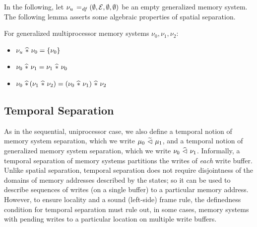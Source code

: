 \documentclass[11pt]{report}         %
\begin{document}
In the following, let $\nu_u \operatorname{\;=_{\mathit{df}}\;} (\operatorname{\emptyset}, \mathcal{E}, \operatorname{\emptyset}, \operatorname{\emptyset})$ be an empty generalized memory system. The following lemma asserts some algebraic properties of spatial separation. \begin{proposition}
  \label{lem:spatial-separation-algebra}
  For generalized multiprocessor memory systems $\nu_0, \nu_1, \nu_2$: 
  \begin{itemize}
    \item $\nu_u \operatorname{\,\widehat{\ast}\,} \nu_0 = \left\lbrace \nu_0 \right\rbrace$
    \item $\nu_0 \operatorname{\,\widehat{\ast}\,} \nu_1 = \nu_1 \operatorname{\,\widehat{\ast}\,} \nu_0$
    \item $\nu_0 \operatorname{\,\widehat{\ast}\,} (\nu_1 \operatorname{\,\widehat{\ast}\,} \nu_2) = (\nu_0 \operatorname{\,\widehat{\ast}\,} \nu_1) \operatorname{\,\widehat{\ast}\,} \nu_2$
  \end{itemize}
\end{proposition}

\subsection{Temporal Separation}
\label{sec:temporal-separation}

As in the sequential, uniprocessor case, we also define a temporal notion of memory system separation, which we write $\mu_0 \operatorname{\,\widetilde{\vartriangleleft}\,} \mu_1$, and a temporal notion of generalized memory system separation, which we write $\nu_0 \operatorname{\,\widehat{\vartriangleleft}\,} \nu_1$. Informally, a temporal separation of memory systems partitions the writes of \emph{each} write buffer. Unlike spatial separation, temporal separation does not require disjointness of the domains of memory addresses described by the states; so it can be used to describe sequences of writes (on a single buffer) to a particular memory address. However, to ensure locality and a sound (left-side) frame rule, the definedness condition for temporal separation must rule out, in some cases, memory systems with pending writes to a particular location on multiple write buffers. 
\end{document}
